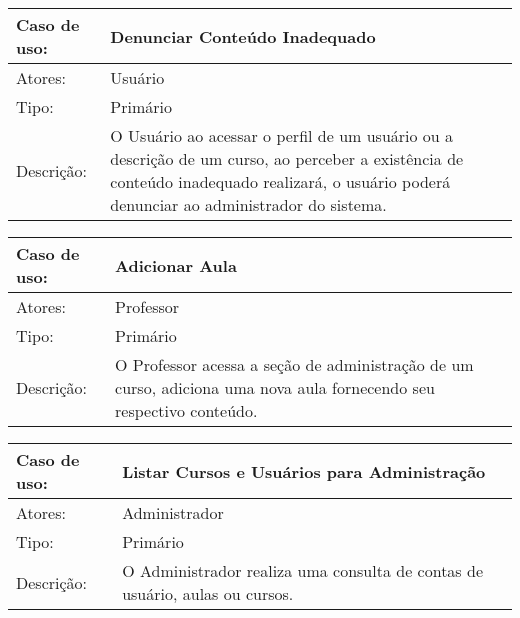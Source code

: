 \documentclass[12pt,a4paper,onecolumn,titlepage]{article}
\begin{document}
\begin{table}[h!]
\begin{center}
\begin{tabular}{p{2.5cm} p{9.5cm}}
Caso de uso: & \textbf{Denunciar Conteúdo Inadequado} \\ \hline
Atores: & Usuário \\ \hline
Tipo: & Primário \\ \hline
Descrição: & O Usuário ao acessar o perfil de um usuário ou a descrição de um curso, ao perceber a existência de conteúdo inadequado realizará, o usuário poderá denunciar ao administrador do sistema.

\end{tabular}
\end{center}
\end{table}

\begin{table}[h!]
\begin{center}
\begin{tabular}{p{2.5cm} p{9.5cm}}
Caso de uso: & \textbf{Adicionar Aula} \\ \hline
Atores: & Professor \\ \hline
Tipo: & Primário \\ \hline
Descrição: & O Professor acessa a seção de administração de um curso, adiciona uma nova aula fornecendo seu respectivo conteúdo.

\end{tabular}
\end{center}
\end{table}


\begin{table}[h!]
\begin{center}
\begin{tabular}{p{2.5cm} p{9.5cm}}
Caso de uso: & \textbf{Listar Cursos e Usuários para Administração} \\ \hline
Atores: & Administrador \\ \hline
Tipo: & Primário \\ \hline
Descrição: & O Administrador realiza uma consulta de contas de usuário, aulas ou cursos.

\end{tabular}
\end{center}
\end{table}
\end{document}
